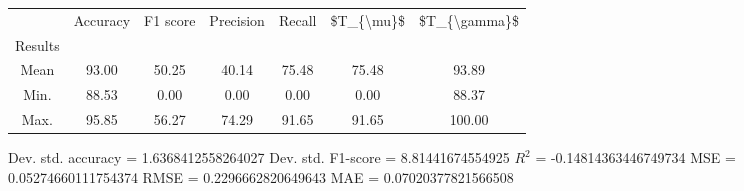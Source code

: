 \begin{tabular}{|c|c|c|c|c|c|c|}
\toprule
{} &  Accuracy &  F1 score &  Precision &  Recall &  \$T\_\{\textbackslash mu\}\$ &  \$T\_\{\textbackslash gamma\}\$ \\
Results &           &           &            &         &            &               \\
\hline
Mean    &     93.00 &     50.25 &      40.14 &   75.48 &      75.48 &         93.89 \\
Min.    &     88.53 &      0.00 &       0.00 &    0.00 &       0.00 &         88.37 \\
Max.    &     95.85 &     56.27 &      74.29 &   91.65 &      91.65 &        100.00 \\
\bottomrule
\end{tabular}

 Dev. std. accuracy = 1.6368412558264027
 Dev. std. F1-score = 8.81441674554925
 $R^2$ = -0.14814363446749734
 MSE = 0.05274660111754374
 RMSE = 0.2296662820649643
 MAE = 0.07020377821566508